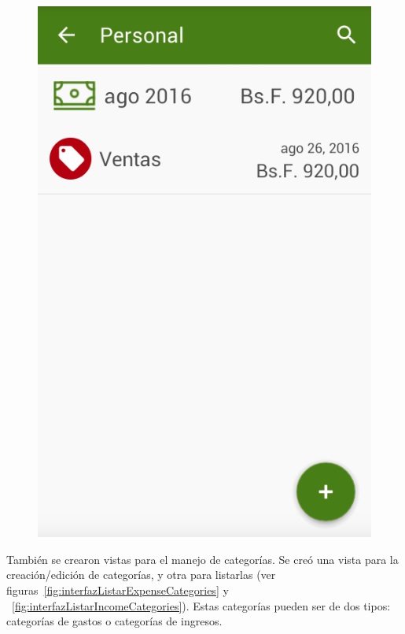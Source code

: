 \begin{figure}[ht]
\begin{minipage}{.5\textwidth}
  \includegraphics[scale=0.45,type=png,ext=.png,read=.png]{imagenes/incomes_list}
  \captionsetup{justification=centering}
  \label{fig:interfazListarIncomes}
\end{minipage}
\end{figure}

También se crearon vistas para el manejo de categorías. Se creó una vista para la creación/edición de categorías, y otra para listarlas (ver figuras~\ref{fig:interfazListarExpenseCategories} y ~\ref{fig:interfazListarIncomeCategories}). Estas categorías pueden ser de dos tipos: categorías de gastos o categorías de ingresos.

